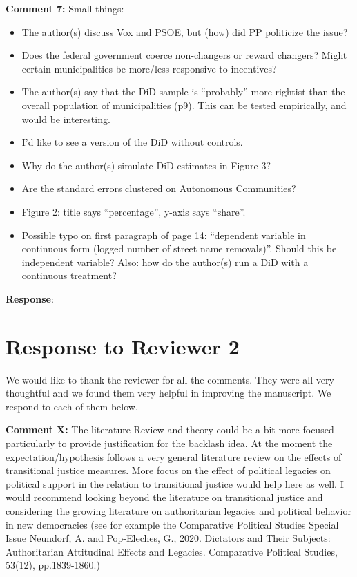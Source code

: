 \documentclass[12pt, a4paper, notitlepage]{article}
\begin{document}
\textbf{Comment 7:} Small things:
\begin{itemize}
  \item The author(s) discuss Vox and PSOE, but (how) did PP politicize the issue?
  \item Does the federal government coerce non-changers or reward changers? Might certain
  municipalities be more/less responsive to incentives?
  \item The author(s) say that the DiD sample is “probably” more rightist than the overall
  population of municipalities (p9). This can be tested empirically, and would be
  interesting.
  \item I’d like to see a version of the DiD without controls.
  \item Why do the author(s) simulate DiD estimates in Figure 3?
  \item Are the standard errors clustered on Autonomous Communities?
  \item Figure 2: title says “percentage”, y-axis says “share”.
  \item Possible typo on first paragraph of page 14: “dependent variable in continuous form
  (logged number of street name removals)”. Should this be independent variable? Also: how do the author(s) run a DiD with a continuous treatment?
\end{itemize}

\textbf{Response}: {\color{red}{pending}}

\newpage
\section*{Response to Reviewer 2}

We would like to thank the reviewer for all the comments. They were all very thoughtful and we found them very helpful in improving the manuscript. We respond to each of them below.

\textbf{Comment X:} The literature Review and theory could be a bit more focused particularly to provide justification for the backlash idea. At the moment the expectation/hypothesis follows a very general literature review on the effects of transitional justice measures. More focus on the effect of political legacies on political support in the relation to transitional justice would help here as well. I would recommend looking beyond the literature on transitional justice and considering the growing literature on authoritarian legacies and political behavior in new democracies (see for example the Comparative Political Studies Special Issue Neundorf, A. and Pop-Eleches, G., 2020. Dictators and Their Subjects: Authoritarian Attitudinal Effects and Legacies. Comparative Political Studies, 53(12), pp.1839-1860.)
\end{document}
